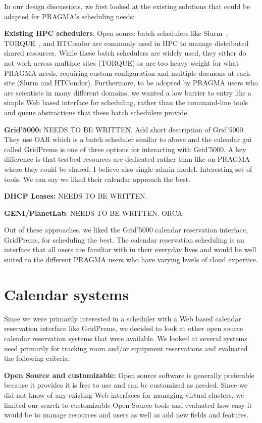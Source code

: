 \documentclass{acm_proc_article-sp}
\begin{document}
In our design discussions, we first looked at the existing solutions that could be adapted for PRAGMA's scheduling needs:

\textbf{Existing HPC schedulers}:  Open source batch schedulers like Slurm~\cite{slurm}, TORQUE~\cite{torque}, and HTCondor are commonly used in  HPC to manage distributed  shared resources.  While these batch schedulers  are widely used, they either do not work across multiple sites (TORQUE) or are too heavy weight for what PRAGMA needs, requiring custom configuration and multiple daemons at each site (Slurm and HTCondor).  Furthermore, to be adopted by PRAGMA users who are scientists in many different domains,  we wanted a low barrier to entry like a simple Web based interface for scheduling, rather than the command-line tools and queue abstractions that these batch schedulers provide.

\textbf{Grid'5000:}   NEEDS TO BE WRITTEN.  Add short description of Grid'5000.  They use OAR which is a batch scheduler similar to above and the calendar gui called GridPrems is one of three options for interacting with Grid'5000.  A key difference is that testbed resources are dedicated rather than like on PRAGMA where they could be shared;  I believe also single admin model.  Interesting set of tools.  We can say we liked their calendar approach the best.

\textbf{DHCP Leases:}  NEEDS TO BE WRITTEN.

\textbf{GENI/PlanetLab}:  NEEDS TO BE WRITTEN.  ORCA

Out of these approaches, we liked the Grid'5000 calendar reservation interface, GridPrems, for scheduling the best.  The calendar reservation scheduling is an interface that all users are familiar with in their everyday lives and would be well suited to the different PRAGMA users who have varying levels of cloud expertise.  

\section{Calendar systems}
\label{Sec:Calendars}

Since we were primarily interested in a scheduler with a Web based calendar reservation interface like GridPrems, we decided to look at other open source calendar reservation systems that were available.  We looked at several systems used primarily for tracking room and/or equipment reservations and evaluated the following criteria:

\textbf{Open Source and customizable:}  Open source software is generally preferable because it provides it is free to use and can be customized as needed.  Since we did not know of any existing Web interfaces for managing virtual clusters, we limited our search to customizable Open Source tools and evaluated how easy it would be to manage resources and users as well as add new fields and features. 
\end{document}
